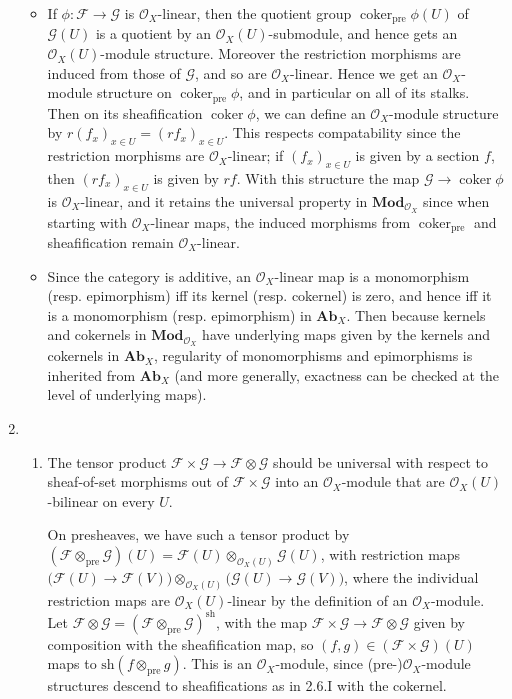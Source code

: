 \documentclass{report}
\newcommand{\cat}[1]{\mathbf{#1}} %
\newcommand{\pre}{{\mathrm{pre}}} %
\newcommand{\sh}{{\mathrm{sh}}} %
\renewcommand{\O}{\mathscr{O}} %
\newcommand{\scrF}{\mathscr{F}}
\newcommand{\scrG}{\mathscr{G}}
\DeclareMathOperator{\coker}{coker}
\begin{document}
\begin{enumerate}[label=\textbf{2.6.\Alph*.}]
\begin{itemize}
		      \item If $\phi:\scrF\to\scrG$ is $\O_X$-linear, then the quotient group
		            $\coker_\pre\phi(U)$ of $\scrG(U)$ is a quotient by an
		            $\O_X(U)$-submodule, and hence gets an $\O_X(U)$-module
		            structure. Moreover the restriction morphisms are induced from
		            those of $\scrG$, and so are $\O_X$-linear. Hence we get an
		            $\O_X$-module structure on $\coker_\pre\phi$, and in particular
		            on all of its stalks. Then on its sheafification $\coker\phi$,
		            we can define an $\O_X$-module structure by
		            $r(f_x)_{x\in U}=(rf_x)_{x\in U}$. This respects compatability
		            since the restriction morphisms are $\O_X$-linear; if
		            $(f_x)_{x\in U}$ is given by a section $f$, then
		            $(rf_x)_{x\in U}$ is given by $rf$. With this structure the map
		            $\scrG\to\coker\phi$ is $\O_X$-linear, and it retains the universal
		            property in $\cat{Mod}_{\O_X}$ since when starting with
		            $\O_X$-linear maps, the induced morphisms from $\coker_\pre$ and
		            sheafification remain $\O_X$-linear.

		      \item Since the category is additive, an $\O_X$-linear map is a
		            monomorphism (resp. epimorphism) iff its kernel (resp. cokernel)
		            is zero, and hence iff it is a monomorphism (resp. epimorphism)
		            in $\cat{Ab}_X$. Then because kernels and cokernels in
		            $\cat{Mod}_{\O_X}$ have underlying maps given by the kernels and
		            cokernels in $\cat{Ab}_X$, regularity of monomorphisms and
		            epimorphisms is inherited from $\cat{Ab}_X$ (and more generally,
		            exactness can be checked at the level of underlying maps).
	      \end{itemize}

	\item
	      \begin{enumerate}[label=(\alph*)]
		      \item The tensor product $\scrF\times\scrG\to\scrF\otimes\scrG$ should be
		            universal with respect to sheaf-of-set morphisms out of
		            $\scrF\times\scrG$ into an $\O_X$-module that are $\O_X(U)$-bilinear on every $U$.

		            On presheaves, we have such a tensor product by
		            $(\scrF\otimes_\pre\scrG)(U)=\scrF(U)\otimes_{\O_X(U)}\scrG(U)$, with
		            restriction maps
		            $\bigl(\scrF(U)\to\scrF(V)\bigr)\otimes_{\O_X(U)}\bigl(\scrG(U)\to\scrG(V)\bigr)$,
		            where the individual restriction maps are $\O_X(U)$-linear by
		            the definition of an $\O_X$-module. Let
		            $\scrF\otimes\scrG=(\scrF\otimes_\pre\scrG)^\sh$, with the map
		            $\scrF\times\scrG\to\scrF\otimes\scrG$ given by composition with the
		            sheafification map, so $(f,g)\in(\scrF\times\scrG)(U)$ maps to
		            $\sh(f\otimes_\pre g)$.
		            This is an $\O_X$-module, since (pre-)$\O_X$-module structures
		            descend to sheafifications as in 2.6.I with the cokernel.


\end{enumerate}
\end{enumerate}
\end{document}
